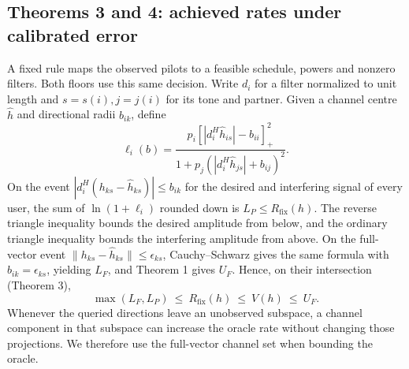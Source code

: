 \documentclass[lineno,pdflatex,sn-nature]{sn-jnl}
\begin{document}
\subsection*{Theorems 3 and 4: achieved rates under calibrated error}
A fixed rule maps the observed pilots to a feasible schedule, powers and nonzero filters. Both floors use this same decision. Write \(d_i\) for a filter normalized to unit length and \(s=s(i),j=j(i)\) for its tone and partner. Given a channel centre \(\hat h\) and directional radii \(b_{ik}\), define
\[
 \ell_i(b)=\frac{p_i\left[|d_i^H\hat h_{is}|-b_{ii}\right]_{+}^2}
                 {1+p_j(|d_i^H\hat h_{js}|+b_{ij})^2}.
\]
On the event \(|d_i^H(h_{ks}-\hat h_{ks})|\leq b_{ik}\) for the desired and interfering signal of every user, the sum of \(\ln(1+\ell_i)\) rounded down is \(L_P\leq{R_{\mathrm{fix}}}(h)\). The reverse triangle inequality bounds the desired amplitude from below, and the ordinary triangle inequality bounds the interfering amplitude from above. On the full-vector event \(\|h_{ks}-\hat h_{ks}\|\leq\epsilon_{ks}\), Cauchy--Schwarz gives the same formula with \(b_{ik}=\epsilon_{ks}\), yielding \(L_F\), and Theorem 1 gives \(U_F\). Hence, on their intersection (Theorem 3),
\[
       \max(L_F,L_P)\ \leq\ {R_{\mathrm{fix}}}(h)\ \leq\ V(h)\ \leq\ U_F .
\]
Whenever the queried directions leave an unobserved subspace, a channel component in that subspace can increase the oracle rate without changing those projections. We therefore use the full-vector channel set when bounding the oracle.
\end{document}

